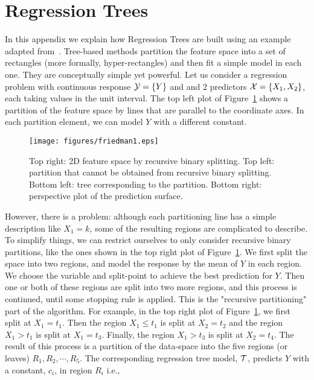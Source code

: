 \section{Regression Trees}
\label{A:RegTrees}
\textcolor[rgb]{0,0,1}{
In this appendix we explain how Regression Trees are built using an example adapted from~\cite{hastie2009elements}.
Tree-based methods partition the feature space into a set of rectangles (more formally, hyper-rectangles) and then fit a simple model in each one. They are conceptually simple yet powerful.
Let us consider a regression problem with continuous response $\mathcal{Y} = \{Y\}$ and and 2 predictors $\mathcal{X} = \{X_1,X_2\}$, each taking values in the unit interval. The top left plot of Figure~\ref{fig:friedman} shows a partition of the feature space by lines that are parallel to the coordinate axes. In each partition element, we can model $Y$ with a different constant.
\begin{figure}
  \centering
  \texttt{[image: figures/friedman1.eps]}
  \vspace{-8pt}
  \caption{Top right: 2D feature space by recursive binary splitting. Top left: partition that cannot be obtained from recursive binary splitting. Bottom left: tree corresponding to the partition. Bottom right:  perspective plot of the prediction surface.}
  \label{fig:friedman}
   \vspace{-10pt}
\end{figure} 
However, there is a problem: although each partitioning line has a simple description like $X_1 = k$, some of the resulting regions are complicated to describe.
To simplify things, we can restrict ourselves to only consider recursive binary partitions, like the ones shown in the top right plot of Figure~\ref{fig:friedman}.
We first split the space into two regions, and model the response by the mean of $Y$ in each region. 
We choose the variable and split-point to achieve the best prediction for $Y$. 
Then one or both of these regions are split into two more regions, and this process is continued, until some stopping rule is applied. This is the "recursive partitioning" part of the  algorithm. 
For example, in the top right plot of Figure~\ref{fig:friedman}, we first split at $X_1 = t_1$. 
Then the region $X_1 \leq t_1$ is split at $X_2 = t_2$ and the region $X_1 > t_1$ is split at $X_1 = t_3$.
Finally, the region $X_1 > t_3$ is split at $X_2 = t_4$. 
The result of this process is a partition of the data-space into the five regions (or leaves) $R_1, R_2,\cdots, R_5$.
The corresponding regression tree model, $\mathcal{T}$, predicts $Y$ with a constant, $c_i$, in region $R_i$ i.e.,
}
